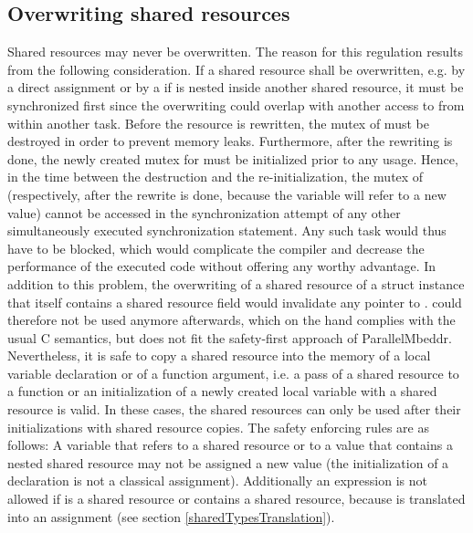 \subsection{Overwriting shared resources}
\label{overwritingSharedResources}
Shared resources may never be overwritten. The reason for this regulation results from the following consideration. If a shared resource  shall be overwritten, e.g. by a direct assignment or by a  if  is nested inside another shared resource, it must be synchronized first since the overwriting could overlap with another access to  from within another task. Before the resource is rewritten, the mutex of  must be destroyed in order to prevent memory leaks. Furthermore, after the rewriting is done, the newly created mutex for  must be initialized prior to any usage. Hence, in the time between the destruction and the re-initialization, the mutex of  (respectively,  after the rewrite is done, because the variable will refer to a new value) cannot be accessed in the synchronization attempt of any other simultaneously executed synchronization statement. Any such task would thus have to be blocked, which would complicate the compiler and decrease the performance of the executed code without offering any worthy advantage. In addition to this problem, the overwriting of a shared resource of a struct instance that itself contains a shared resource field  would invalidate any pointer  to .  could therefore not be used anymore afterwards, which on the hand complies with the usual C semantics, but does not fit the safety-first approach of ParallelMbeddr.
Nevertheless, it is safe to copy a shared resource into the memory of a local variable declaration or of a function argument, i.e. a pass of a shared resource to a function or an initialization of a newly created local variable with a shared resource is valid. In these cases, the shared resources can only be used after their initializations with shared resource copies.
The safety enforcing rules are as follows: A variable that refers to a shared resource or to a value that contains a nested shared resource may not be assigned a new value (the initialization of a declaration is not a classical assignment). Additionally an expression  is not allowed if  is a shared resource or contains a shared resource, because  is translated into an assignment (see section \ref{sharedTypesTranslation}).